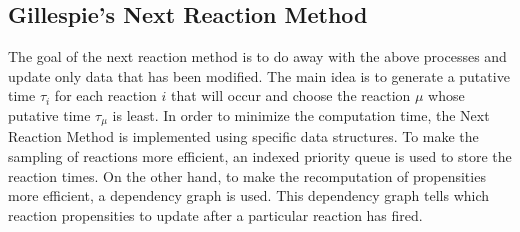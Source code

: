 \documentclass[11pt,a4paper]{article}
\begin{document}
\subsection{Gillespie's Next Reaction Method}
The goal of the next reaction method is to do away with the above processes and update only data that has been modified. The main idea is to generate a putative time $\tau_i$ for each reaction $i$ that will occur and choose the reaction $\mu$ whose putative time $\tau_{\mu}$ is least. In order to minimize the computation time, the Next Reaction Method is implemented using specific data structures.
To make the sampling of reactions more efficient, an indexed priority queue is used to store the reaction times. On the other hand, to make the recomputation of propensities more efficient, a dependency graph is used. This dependency graph tells which reaction propensities to update after a particular reaction has fired.
\end{document}
